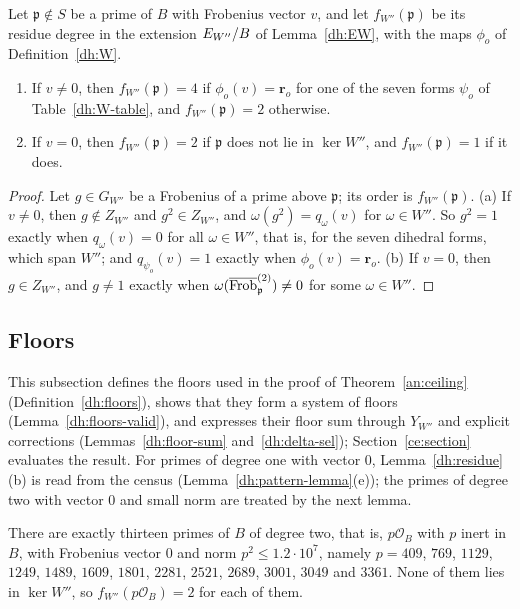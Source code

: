 \begin{lemma}\label{dh:residue}
Let $\mathfrak p\notin S$ be a prime of $B$ with Frobenius vector $v$, and let
$f_{W''}(\mathfrak p)$ be its residue degree in the extension $E_{W''}/B$ of
Lemma~\ref{dh:EW}, with the maps $\phi_o$ of Definition~\ref{dh:W}.
\begin{enumerate}
\item[(a)] If $v\ne0$, then $f_{W''}(\mathfrak p)=4$ if
 $\phi_o(v)=\mathbf r_o$ for one of the seven forms $\psi_o$ of
 Table~\ref{dh:W-table}, and $f_{W''}(\mathfrak p)=2$ otherwise.
\item[(b)] If $v=0$, then $f_{W''}(\mathfrak p)=2$ if $\mathfrak p$ does not lie
 in $\ker W''$, and $f_{W''}(\mathfrak p)=1$ if it does.
\end{enumerate}
\end{lemma}

\begin{proof}
Let $g\in G_{W''}$ be a Frobenius of a prime above $\mathfrak p$; its order is
$f_{W''}(\mathfrak p)$. (a) If $v\ne0$, then $g\notin Z_{W''}$ and $g^2\in
Z_{W''}$, and $\omega(g^2)=q_\omega(v)$ for $\omega\in W''$. So $g^2=1$
exactly when $q_\omega(v)=0$ for all $\omega\in W''$, that is, for the seven
dihedral forms, which span $W''$; and $q_{\psi_o}(v)=1$ exactly when
$\phi_o(v)=\mathbf r_o$. (b) If $v=0$, then $g\in Z_{W''}$, and $g\ne1$
exactly when $\omega(\overline{\operatorname{Frob}}^{(2)}_{\mathfrak p})\ne0$ for some
$\omega\in W''$.
\end{proof}

\subsection{Floors}\label{dh:floors-section}
This subsection defines the floors used in the proof of
Theorem~\ref{an:ceiling} (Definition~\ref{dh:floors}), shows that they form a
system of floors (Lemma~\ref{dh:floors-valid}), and expresses their floor
sum through $Y_{W''}$ and explicit corrections
(Lemmas~\ref{dh:floor-sum} and~\ref{dh:delta-sel}); Section~\ref{ce:section}
evaluates the result. For primes of degree one with vector $0$,
Lemma~\ref{dh:residue}(b) is read from the census
(Lemma~\ref{dh:pattern-lemma}(e)); the primes of degree two with vector $0$
and small norm are treated by the next lemma.

\begin{lemma}\label{dh:inert-v0}
There are exactly thirteen primes of $B$ of degree two, that is,
$p\mathcal O_B$ with $p$ inert in $B$, with Frobenius vector $0$ and norm
$p^2\le1.2\cdot10^7$, namely $p=409$, $769$, $1129$, $1249$, $1489$, $1609$,
$1801$, $2281$, $2521$, $2689$, $3001$, $3049$ and $3361$. None of them lies
in $\ker W''$, so $f_{W''}(p\mathcal O_B)=2$ for each of them.
\end{lemma}

